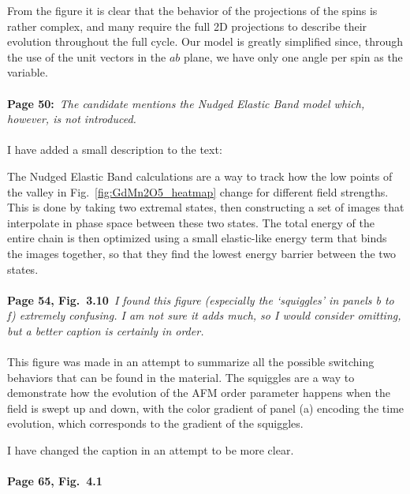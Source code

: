 \documentclass[a4, UTF8]{article}
\begin{document}
From the figure it is clear that the behavior of the projections of the spins is rather complex, and many require the full 2D projections to describe their evolution throughout the full cycle.
Our model is greatly simplified since, through the use of the unit vectors in the $ab$ plane, we have only one angle per spin as the variable.
\\\\
{\bf Page 50:}~{\it The candidate mentions the Nudged Elastic Band model which, however, is not introduced.}
\\\\
I have added a small description to the text:

The Nudged Elastic Band calculations are a way to track how the low points of the valley in Fig.~\ref{fig:GdMn2O5_heatmap} change for different field strengths.
This is done by taking two extremal states, then constructing a set of images that interpolate in phase space between these two states. The total energy of the entire chain is then optimized using a small elastic-like energy term that binds the images together, so that they find the lowest energy barrier between the two states.  
\\\\
{\bf Page 54, Fig.~3.10}~{\it I found this figure (especially the `squiggles' in panels b to f) extremely confusing. I am not sure it adds much, so I would consider omitting, but a better caption is certainly in order.}
\\\\
This figure was made in an attempt to summarize all the possible switching behaviors that can be found in the material. The squiggles are a way to demonstrate how the evolution of the AFM order parameter happens when the field is swept up and down, with the color gradient of panel (a) encoding the time evolution, which corresponds to the gradient of the squiggles.

I have changed the caption in an attempt to be more clear.
\\\\
{\bf Page 65, Fig.~4.1}~{\it }
\end{document}
